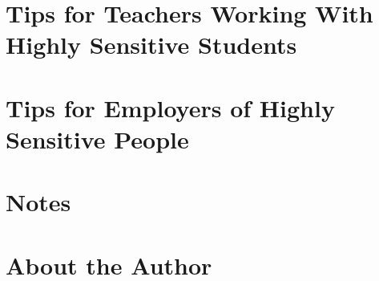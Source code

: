 \documentclass{article}
\numberwithin{equation}{section}
\begin{document}

\section{Tips for Teachers Working With Highly Sensitive Students}


\section{Tips for Employers of Highly Sensitive People}


\section{Notes}


\section{About the Author}


\printbibliography[heading=bibintoc]
	
\end{document}
